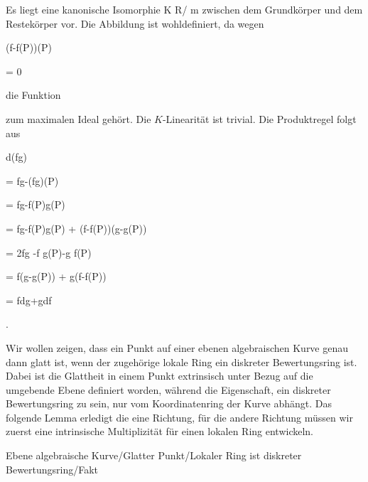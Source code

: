 {


Es liegt eine kanonische Isomorphie
\maabb {} { K } { R/ {\mathfrak m}
} {}
zwischen dem Grund\-körper und dem Restekörper vor. Die Abbildung ist wohldefiniert, da wegen


\mavergleichskette

{\vergleichskette

{ (f-f(P))(P)
}

{ = }{ 0
}

{  }{
}

{    }{
}

{   }{
}

}
{}{}{}
die Funktion

 zum maximalen Ideal gehört. Die $K$-Linearität ist trivial. Die Produktregel folgt aus
 {} {}


\mavergleichskettealign

{\vergleichskettealign

{ d(fg)
}

{ =} { fg-(fg)(P)
}

{ =} { fg-f(P)g(P)
}

{ =} { fg-f(P)g(P) + (f-f(P))(g-g(P))
}

{ =} { 2fg -f \cdot g(P)-g \cdot f(P)
}

}
{

\vergleichskettefortsetzungalign

{ =} { f(g-g(P)) + g(f-f(P))
}

{ =} { fdg+gdf
}

{ } {}

{ } {}

}
{}{.}


}




Wir wollen zeigen, dass ein Punkt auf einer ebenen algebraischen Kurve genau dann glatt ist, wenn der zugehörige lokale Ring ein diskreter Bewertungsring ist. Dabei ist die Glattheit in einem Punkt extrinsisch unter Bezug auf die umgebende Ebene definiert worden, während die Eigenschaft, ein diskreter Bewertungsring zu sein, nur vom Koordinatenring der Kurve abhängt. Das folgende Lemma erledigt die eine Richtung, für die andere Richtung müssen wir zuerst eine intrinsische Multiplizität für einen lokalen Ring entwickeln.



{Ebene algebraische Kurve/Glatter Punkt/Lokaler Ring ist diskreter Bewertungsring/Fakt}

